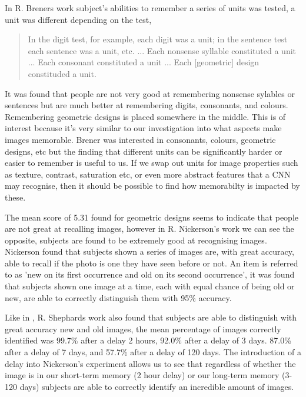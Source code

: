 \documentclass{UoYCSproject}
\begin{document}
In R. Breners work \cite{BrenerMemorySpan} subject's abilities to remember a series of units was tested, a unit was different depending on the test, 
\begin{quote}
    In the digit test, for example, each digit was a unit; in the sentence test each sentence was a unit, etc. ... Each nonsense syllable constituted a unit ... Each consonant constituted a unit ... Each [geometric] design constituded a unit. \cite[p.468]{BrenerMemorySpan}
\end{quote}

It was found that people are not very good at remembering nonsense sylables or sentences but are much better at remembering digits, consonants, and colours. Remembering geometric designs is placed somewhere in the middle. This is of interest because it's very similar to our investigation into what aspects make images memorable. Brener was interested in consonants, colours, geometric designs, etc but the finding that different units can be significantly harder or easier to remember is useful to us. If we swap out units for image properties such as texture, contrast, saturation etc, or even more abstract features that a CNN may recognise, then it should be possible to find how memorabilty is impacted by these.   

The mean score of 5.31 found for geometric designs seems to indicate that people are not great at recalling images, however in R. Nickerson's work \cite{NickersonShortTermMemory} we can see the opposite, subjects are found to be extremely good at recognising images. Nickerson found that subjects shown a series of images are, with great accuracy, able to recall if the photo is one they have seen before or not. An item is referred to as 'new on its first occurrence and old on its second occurrence'\cite[p.156]{NickersonShortTermMemory}, it was found that subjects shown one image at a time, each with equal chance of being old or new, are able to correctly distinguish them with 95\% accuracy. 

Like in \cite{NickersonShortTermMemory},  R. Shephards work \cite{ShepardRecognition} also found that subjects are able to distinguish with great accuracy new and old images, the mean percentage of images correctly identified was 99.7\% after a delay 2 hours, 92.0\% after a delay of 3 days. 87.0\% after a delay of 7 days, and 57.7\% after a delay of 120 days. The introduction of a delay into Nickerson's experiment allows us to see that regardless of whether the image is in our short-term memory (2 hour delay) or our long-term memory (3-120 days) subjects are able to correctly identify an incredible amount of images. 
\end{document}
